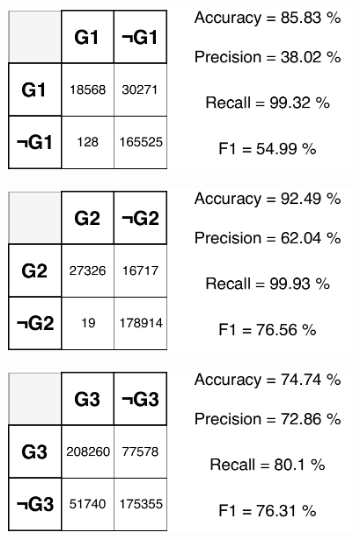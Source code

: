 \begin{figure}[H]

\begin{subfigure}{.33\textwidth}
  \centering
  \includegraphics[width=\textwidth]{tex/images/results/rese_g1}  
\end{subfigure}%
\begin{subfigure}{.33\textwidth}
  \centering
  \includegraphics[width=\textwidth]{tex/images/results/rese_g2}
\end{subfigure}
\begin{subfigure}{.33\textwidth}
  \centering
  \includegraphics[width=\textwidth]{tex/images/results/rese_g3}
\end{subfigure}


\end{figure}
